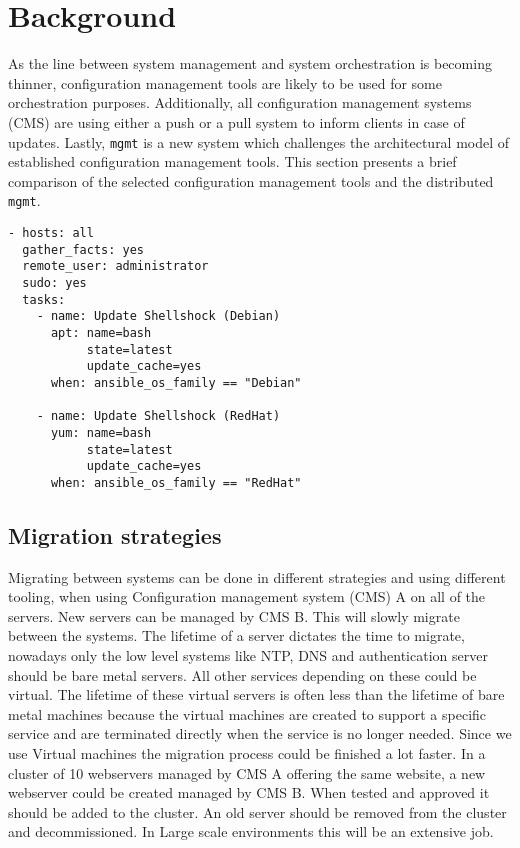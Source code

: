 \section{Background}\label{sec:background}
As the line between system management and system orchestration is becoming thinner, configuration management tools are likely to be used for some orchestration purposes. Additionally, all configuration management systems (CMS) are using either a push or a pull system to inform clients in case of updates. Lastly, \texttt{mgmt} is a new system which challenges the architectural model of established configuration management tools. This section presents a brief comparison of the selected configuration management tools and the distributed \texttt{mgmt}.

\begin{lstlisting}[caption={Shellshock security patching with Ansible playbook},label=lst:shellshock]
- hosts: all
  gather_facts: yes
  remote_user: administrator
  sudo: yes
  tasks:
    - name: Update Shellshock (Debian)
      apt: name=bash
           state=latest
           update_cache=yes
      when: ansible_os_family == "Debian"
 
    - name: Update Shellshock (RedHat)
      yum: name=bash
           state=latest
           update_cache=yes
      when: ansible_os_family == "RedHat"
\end{lstlisting}

\subsection{Migration strategies}\label{subsec:migrationstrategies}
Migrating between systems can be done in different strategies and using different tooling, when using Configuration management system (CMS) A on all of the servers. New servers can be managed by CMS B. This will slowly migrate between the systems. The lifetime of a server dictates the time to migrate, nowadays only the low level systems like NTP, DNS and authentication server should be bare metal servers. All other services depending on these could be virtual. The lifetime of these virtual servers is often less than the lifetime of bare metal machines because the virtual machines are created to support a specific service and are terminated directly when the service is no longer needed. Since we use Virtual machines the migration process could be finished a lot faster. In a cluster of 10 webservers managed by CMS A offering the same website, a new webserver could be created managed by CMS B. When tested and approved it should be added to the cluster. An old server should be removed from the cluster and decommissioned. In Large scale environments this will be an extensive job.

